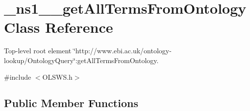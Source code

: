 \hypertarget{class__ns1____getAllTermsFromOntology}{
\section{\_\-ns1\_\-\_\-getAllTermsFromOntology Class Reference}
\label{class__ns1____getAllTermsFromOntology}
}


Top-\/level root element \char`\"{}http://www.ebi.ac.uk/ontology-\/lookup/OntologyQuery\char`\"{}:getAllTermsFromOntology.  




{\ttfamily \#include $<$OLSWS.h$>$}

\subsection*{Public Member Functions}

